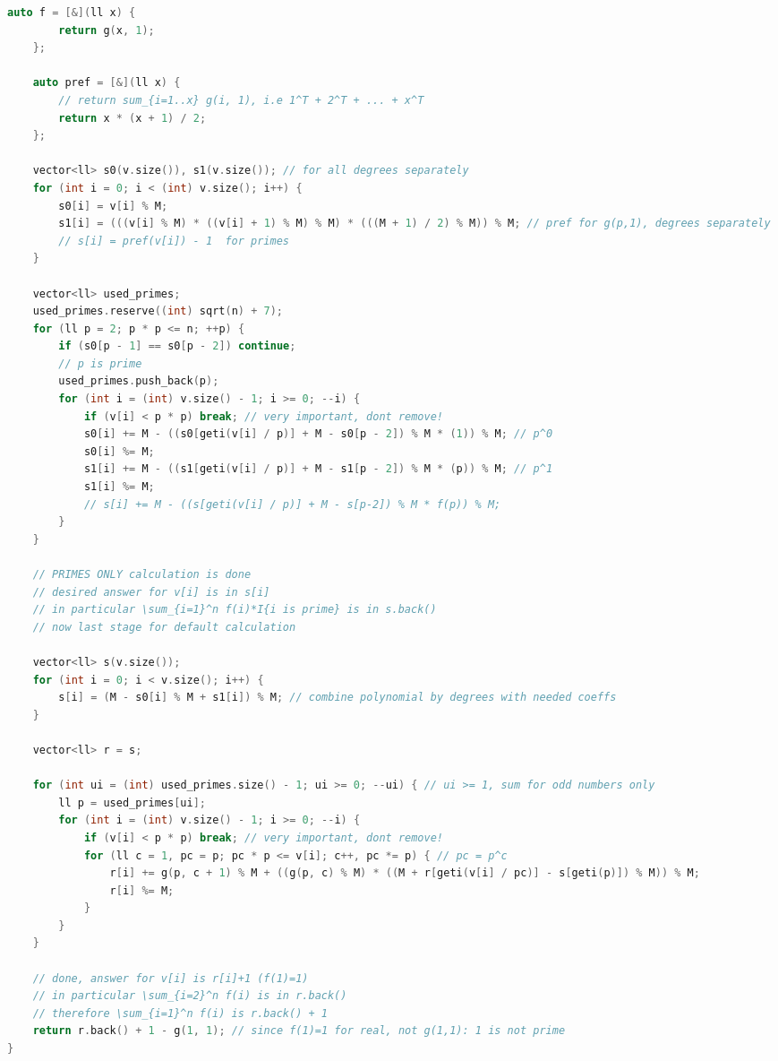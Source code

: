 \documentclass[9pt,a4paper,landscape,twosided]{extarticle}
\begin{document}
\begin{multicols*}{3}
\begin{lstlisting}[language=C++]
    auto f = [&](ll x) {
        return g(x, 1);
    };

    auto pref = [&](ll x) {
        // return sum_{i=1..x} g(i, 1), i.e 1^T + 2^T + ... + x^T
        return x * (x + 1) / 2;
    };

    vector<ll> s0(v.size()), s1(v.size()); // for all degrees separately
    for (int i = 0; i < (int) v.size(); i++) {
        s0[i] = v[i] % M;
        s1[i] = (((v[i] % M) * ((v[i] + 1) % M) % M) * (((M + 1) / 2) % M)) % M; // pref for g(p,1), degrees separately
        // s[i] = pref(v[i]) - 1  for primes
    }

    vector<ll> used_primes;
    used_primes.reserve((int) sqrt(n) + 7);
    for (ll p = 2; p * p <= n; ++p) {
        if (s0[p - 1] == s0[p - 2]) continue;
        // p is prime
        used_primes.push_back(p);
        for (int i = (int) v.size() - 1; i >= 0; --i) {
            if (v[i] < p * p) break; // very important, dont remove!
            s0[i] += M - ((s0[geti(v[i] / p)] + M - s0[p - 2]) % M * (1)) % M; // p^0
            s0[i] %= M;
            s1[i] += M - ((s1[geti(v[i] / p)] + M - s1[p - 2]) % M * (p)) % M; // p^1
            s1[i] %= M;
            // s[i] += M - ((s[geti(v[i] / p)] + M - s[p-2]) % M * f(p)) % M;
        }
    }

    // PRIMES ONLY calculation is done
    // desired answer for v[i] is in s[i]
    // in particular \sum_{i=1}^n f(i)*I{i is prime} is in s.back()
    // now last stage for default calculation

    vector<ll> s(v.size());
    for (int i = 0; i < v.size(); i++) {
        s[i] = (M - s0[i] % M + s1[i]) % M; // combine polynomial by degrees with needed coeffs
    }

    vector<ll> r = s;

    for (int ui = (int) used_primes.size() - 1; ui >= 0; --ui) { // ui >= 1, sum for odd numbers only
        ll p = used_primes[ui];
        for (int i = (int) v.size() - 1; i >= 0; --i) {
            if (v[i] < p * p) break; // very important, dont remove!
            for (ll c = 1, pc = p; pc * p <= v[i]; c++, pc *= p) { // pc = p^c
                r[i] += g(p, c + 1) % M + ((g(p, c) % M) * ((M + r[geti(v[i] / pc)] - s[geti(p)]) % M)) % M;
                r[i] %= M;
            }
        }
    }

    // done, answer for v[i] is r[i]+1 (f(1)=1)
    // in particular \sum_{i=2}^n f(i) is in r.back()
    // therefore \sum_{i=1}^n f(i) is r.back() + 1
    return r.back() + 1 - g(1, 1); // since f(1)=1 for real, not g(1,1): 1 is not prime
}
\end{lstlisting}


\end{multicols*}
\end{document}

